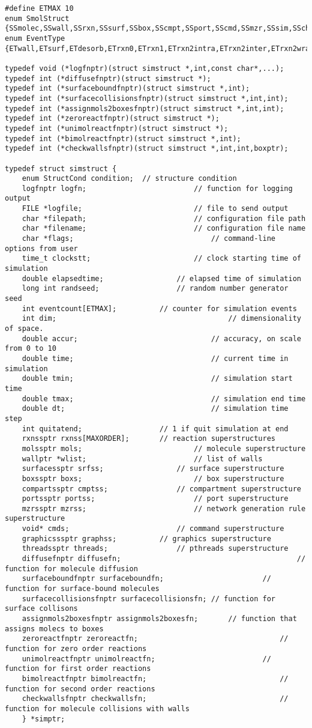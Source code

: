 \documentclass {book}
\begin{document}
\begin{lstlisting}
#define ETMAX 10
enum SmolStruct {SSmolec,SSwall,SSrxn,SSsurf,SSbox,SScmpt,SSport,SScmd,SSmzr,SSsim,SScheck,SSall,SSnone};
enum EventType {ETwall,ETsurf,ETdesorb,ETrxn0,ETrxn1,ETrxn2intra,ETrxn2inter,ETrxn2wrap,ETimport,ETexport};

typedef void (*logfnptr)(struct simstruct *,int,const char*,...);
typedef int (*diffusefnptr)(struct simstruct *);
typedef int (*surfaceboundfnptr)(struct simstruct *,int);
typedef int (*surfacecollisionsfnptr)(struct simstruct *,int,int);
typedef int (*assignmols2boxesfnptr)(struct simstruct *,int,int);
typedef int (*zeroreactfnptr)(struct simstruct *);
typedef int (*unimolreactfnptr)(struct simstruct *);
typedef int (*bimolreactfnptr)(struct simstruct *,int);
typedef int (*checkwallsfnptr)(struct simstruct *,int,int,boxptr);

typedef struct simstruct {
	enum StructCond condition;	// structure condition
	logfnptr logfn;							// function for logging output
	FILE *logfile;							// file to send output
	char *filepath;							// configuration file path
	char *filename;							// configuration file name
	char *flags;								// command-line options from user
	time_t clockstt;						// clock starting time of simulation
	double elapsedtime;					// elapsed time of simulation
	long int randseed;					// random number generator seed
	int eventcount[ETMAX];			// counter for simulation events
	int dim;										// dimensionality of space.
	double accur;								// accuracy, on scale from 0 to 10
	double time;								// current time in simulation
	double tmin;								// simulation start time
	double tmax;								// simulation end time
	double dt;									// simulation time step
	int quitatend;					// 1 if quit simulation at end
	rxnssptr rxnss[MAXORDER];		// reaction superstructures
	molssptr mols;							// molecule superstructure
	wallptr *wlist;							// list of walls
	surfacessptr srfss;					// surface superstructure
	boxssptr boxs;							// box superstructure
	compartssptr cmptss;				// compartment superstructure
	portssptr portss;						// port superstructure
	mzrssptr mzrss;							// network generation rule superstructure
	void* cmds;							// command superstructure
	graphicsssptr graphss;			// graphics superstructure
	threadssptr threads;				// pthreads superstructure
	diffusefnptr diffusefn;											// function for molecule diffusion
	surfaceboundfnptr surfaceboundfn;						// function for surface-bound molecules
	surfacecollisionsfnptr surfacecollisionsfn; // function for surface collisons
	assignmols2boxesfnptr assignmols2boxesfn;		// function that assigns molecs to boxes
	zeroreactfnptr zeroreactfn;									// function for zero order reactions
	unimolreactfnptr unimolreactfn;							// function for first order reactions
	bimolreactfnptr bimolreactfn;								// function for second order reactions
	checkwallsfnptr checkwallsfn;								// function for molecule collisions with walls
	} *simptr;
\end{lstlisting}
\end{document}
